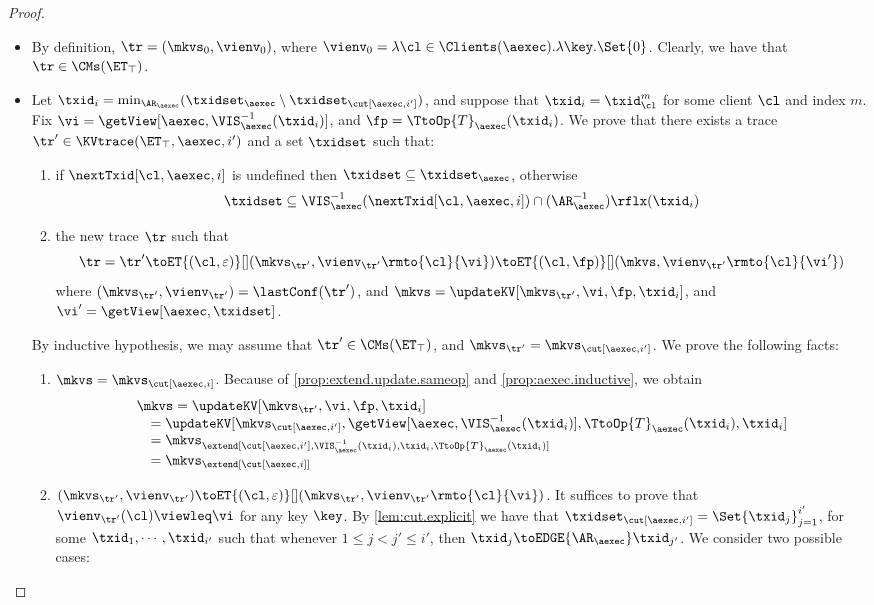 \begin{proof}
\begin{itemize}
\item {} By definition, $\tr = (\mkvs_{0}, \vienv_{0})$, 
where $\vienv_{0} = \lambda \cl \in \Clients(\aexec). \lambda \key.\Set{0}$. 
Clearly, we have that $\tr \in \CMs(\ET_{\top})$. 
\item {} Let $\txid_{i} = \min_{\AR_{\aexec}}(\txidset_{\aexec} \setminus \txidset_{\cut[\aexec, i']})$, 
and suppose that $\txid_{i} = \txid_{\cl}^{m}$ for some client $\cl$ and index $m$. 
Fix $\vi = \getView[\aexec, \VIS_{\aexec}^{-1}(\txid_{i})]$, and  $\fp = \TtoOp{T}_{\aexec}(\txid_{i})$.
We prove that there exists a trace $\tr' \in \KVtrace(\ET_{\top}, \aexec, i')$ and a set 
$\txidset$ such that: 
\begin{enumerate}
\item if $\nextTxid[\cl, \aexec, i]$ is undefined then $\txidset \subseteq \txidset_{\aexec}$, otherwise 
\[
    \txidset \subseteq \VIS^{-1}_{\aexec}(\nextTxid[\cl, \aexec, i]) \cap (\AR_{\aexec}^{-1})\rflx(\txid_{i})
\]
\item the new trace \( \tr \) such that
\[
    \tr = \tr' \toET{(\cl, \varepsilon)}[] (\mkvs_{\tr'}, \vienv_{\tr'}\rmto{\cl}{\vi}) \toET{(\cl, \fp)}[] 
(\mkvs,  \vienv_{\tr'}\rmto{\cl}{\vi'})
\]
where $(\mkvs_{\tr'}, \vienv_{\tr'}) = \lastConf(\tr')$, and $\mkvs = \updateKV[\mkvs_{\tr'}, \vi, \fp, \txid_{i}]$, 
and $\vi' = \getView[\aexec, \txidset]$.
\end{enumerate}
By inductive hypothesis, we may assume that $\tr' \in \CMs(\ET_{\top})$, and $\mkvs_{\tr'} = \mkvs_{\cut[\aexec, i']}$. 
We prove the following facts: 
\begin{enumerate}
\item $\mkvs = \mkvs_{\cut[\aexec, i]}$. 
Because of \cref{prop:extend.update.sameop} and \cref{prop:aexec.inductive},
we obtain 
\[
\begin{array}{l}
\mkvs = \updateKV[\mkvs_{\tr'}, \vi, \fp, \txid_{i}] \\
\quad = \updateKV[\mkvs_{\cut[\aexec, i']}, \getView[\aexec, \VIS^{-1}_{\aexec}(\txid_{i})], \TtoOp{T}_{\aexec}(\txid_{i}), \txid_{i}] \\
\quad = \mkvs_{\extend[\cut[\aexec, i'], \VIS^{-1}_{\aexec}(\txid_{i}), \txid_{i}, \TtoOp{T}_{\aexec}(\txid_{i})] } \\
\quad = \mkvs_{\extend[\cut[\aexec, i]]}
\end{array}
\]

\item $(\mkvs_{\tr'}, \vienv_{\tr'}) \toET{(\cl, \varepsilon)}[] (\mkvs_{\tr'}, \vienv_{\tr'}\rmto{\cl}{\vi})$. 
It suffices to prove that $\vienv_{\tr'}(\cl) \viewleq \vi$ for any key $\key$.
By \cref{lem:cut.explicit} we have that $\txidset_{\cut[\aexec, i']} = \Set{\txid_{j}}_{j=1}^{i'}$, for 
some $\txid_{1},\cdots, \txid_{i'}$ such that whenever $1 \leq j < j' \leq i'$, then 
$\txid_{j} \toEDGE{\AR_{\aexec}} \txid_{j'}$. We consider two possible cases: 


\end{enumerate}
\end{itemize}
\end{proof}

